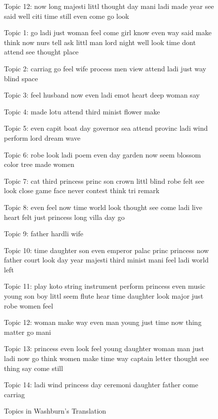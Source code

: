 \documentclass[12pt]{article}
\begin{document}
\begin{flushleft}
\begin{spacing}{2.0}
\begin{figure}
Topic 12: now long majesti littl thought day mani ladi made year see said well citi time still even come go look 
\end{figure}


\begin{figure}
\caption{Topics in Washburn's Translation}
\label{washburn-topics}
\singlespacing
\small
Topic 1: go ladi just woman feel come girl know even way said make think now nurs tell ask littl man lord night well look time dont attend see thought place 

Topic 2: carriag go feel wife process men view attend ladi just way blind space 

Topic 3: feel husband now even ladi emot heart deep woman say 

Topic 4: made lotu attend third minist flower make 

Topic 5: even capit boat day governor sea attend provinc ladi wind perform lord dream wave 

Topic 6: robe look ladi poem even day garden now seem blossom color tree made women 

Topic 7: cat third princess princ son crown littl blind robe felt see look close game face never contest think tri remark 

Topic 8: even feel now time world look thought see come ladi live heart felt just princess long villa day go 

Topic 9: father hardli wife 

Topic 10: time daughter son even emperor palac princ princess now father court look day year majesti third minist mani feel ladi world left 

Topic 11: play koto string instrument perform princess even music young son boy littl seem flute hear time daughter look major just robe women feel 

Topic 12: woman make way even man young just time now thing matter go mani 

Topic 13: princess even look feel young daughter woman man just ladi now go think women make time way captain letter thought see thing say come still 

Topic 14: ladi wind princess day ceremoni daughter father come carriag 
\end{figure}


\end{spacing}
\end{flushleft}
\end{document}
